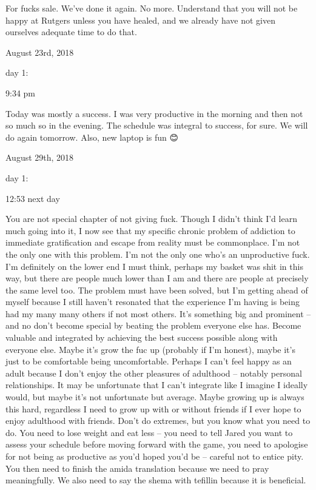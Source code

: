 For fucks sale. We've done it again. No more. Understand that you will
not be happy at Rutgers unless you have healed, and we already have not
given ourselves adequate time to do that.

\bigskip
\bigskip
August 23rd, 2018

day 1:

9:34 pm

Today was mostly a success. I was very productive in the morning and
then not so much so in the evening. The schedule was integral to
success, for sure. We will do again tomorrow. Also, new laptop is fun 😊

\bigskip
\bigskip
August 29th, 2018

day 1:

12:53 next day

You are not special chapter of not giving fuck. Though I didn't think
I'd learn much going into it, I now see that my specific chronic problem
of addiction to immediate gratification and escape from reality must be
commonplace. I'm not the only one with this problem. I'm not the only
one who's an unproductive fuck. I'm definitely on the lower end I must
think, perhaps my basket was shit in this way, but there are people much
lower than I am and there are people at precisely the same level too.
The problem must have been solved, but I'm getting ahead of myself
because I still haven't resonated that the experience I'm having is
being had my many many others if not most others. It's something big and
prominent -- and no don't become special by beating the problem everyone
else has. Become valuable and integrated by achieving the best success
possible along with everyone else. Maybe it's grow the fuc up (probably
if I'm honest), maybe it's just to be comfortable being uncomfortable.
Perhaps I can't feel happy as an adult because I don't enjoy the other
pleasures of adulthood -- notably personal relationships. It may be
unfortunate that I can't integrate like I imagine I ideally would, but
maybe it's not unfortunate but average. Maybe growing up is always this
hard, regardless I need to grow up with or without friends if I ever
hope to enjoy adulthood with friends. Don't do extremes, but you know
what you need to do. You need to lose weight and eat less -- you need to
tell Jared you want to assess your schedule before moving forward with
the game, you need to apologise for not being as productive as you'd
hoped you'd be -- careful not to entice pity. You then need to finish
the amida translation because we need to pray meaningfully. We also need
to say the shema with tefillin because it is beneficial.


